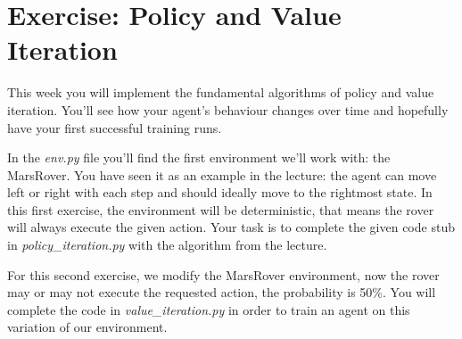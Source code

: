 \documentclass{exam}
\begin{document}
\section*{Exercise: Policy and Value Iteration}

\noindent
This week you will implement the fundamental algorithms of policy and value iteration. You'll see how your agent's behaviour changes over time and hopefully have your first successful training runs.

\begin{questions}
	In the \emph{env.py} file you'll find the first environment we'll work with: the MarsRover. You have seen it as an example in the lecture: the agent can move left or right with each step and should ideally move to the rightmost state.
	In this first exercise, the environment will be deterministic, that means the rover will always execute the given action.
	Your task is to complete the given code stub in \emph{policy\_iteration.py} with the algorithm from the lecture.
	
	For this second exercise, we modify the MarsRover environment, now the rover may or may not execute the requested action, the probability is 50\%. You will complete the code in \emph{value\_iteration.py} in order to train an agent on this variation of our environment.
\end{questions}
\end{document}
